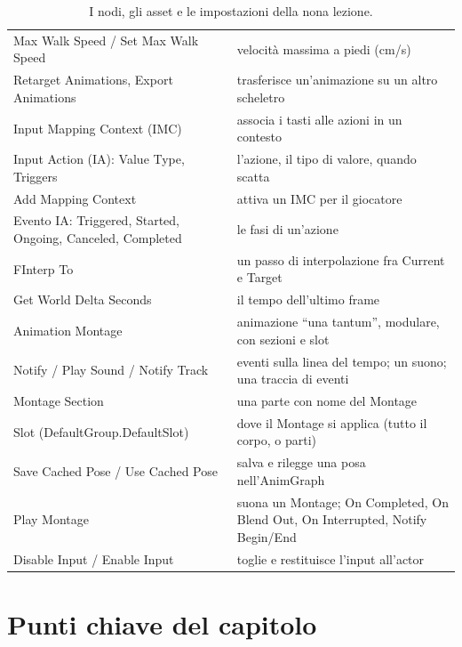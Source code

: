 \begin{table}[htbp]
\begin{tabular}{@{}p{4.8cm}p{9.2cm}@{}}
Max Walk Speed / Set Max Walk Speed & velocità massima a piedi (cm/s) \\
Retarget Animations, Export Animations & trasferisce un'animazione su un altro
scheletro \\
Input Mapping Context (IMC) & associa i tasti alle azioni in un contesto \\
Input Action (IA): Value Type, Triggers & l'azione, il tipo di valore, quando scatta \\
Add Mapping Context & attiva un IMC per il giocatore \\
Evento IA: Triggered, Started, Ongoing, Canceled, Completed & le fasi di un'azione \\
FInterp To & un passo di interpolazione fra Current e Target \\
Get World Delta Seconds & il tempo dell'ultimo frame \\
Animation Montage & animazione ``una tantum'', modulare, con sezioni e slot \\
Notify / Play Sound / Notify Track & eventi sulla linea del tempo; un suono; una traccia
di eventi \\
Montage Section & una parte con nome del Montage \\
Slot (DefaultGroup.DefaultSlot) & dove il Montage si applica (tutto il corpo, o parti) \\
Save Cached Pose / Use Cached Pose & salva e rilegge una posa nell'AnimGraph \\
Play Montage & suona un Montage; On Completed, On Blend Out, On Interrupted, Notify
Begin/End \\
Disable Input / Enable Input & toglie e restituisce l'input all'actor \\
\bottomrule
\end{tabular}
\caption{I nodi, gli asset e le impostazioni della nona lezione.}
\label{ue9:tab:nodi}
\end{table}

\section*{Punti chiave del capitolo}

